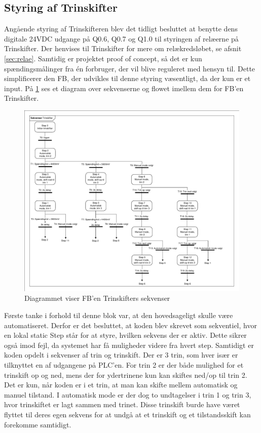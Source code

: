 \subsection{Styring af Trinskifter}

Angående styring af Trinskifteren blev det tidligt besluttet at benytte dens digitale 24VDC udgange på Q0.6, Q0.7 og Q1.0 til styringen af relæerne på Trinskifter. Der henvises til Trinskifter for mere om relækredsløbet, se afsnit \ref{sec:relae}.
Samtidig er projektet proof of concept, så det er kun spændingsmålinger fra én forbruger, der vil blive reguleret med hensyn til. Dette simplificerer den FB, der udvikles til denne styring væsentligt, da der kun er et input. På \ref{fig:GraphTrinskifterPLC} ses et diagram over sekvenserne og flowet imellem dem for FB'en Trinskifter.

\begin{figure}[H] %
	\centering
	\includegraphics[width=1\textwidth]{Figure/GraphTrinskifterPLC}
	\caption{Diagrammet viser FB'en Trinskifters sekvenser}
	\label{fig:GraphTrinskifterPLC}
\end{figure}

Første tanke i forhold til denne blok var, at den hovedsageligt skulle være automatiseret. Derfor er det besluttet, at koden blev skrevet som sekventiel, hvor en lokal static Step står for at styre, hvilken sekvens der er aktiv. Dette sikrer også imod fejl, da systemet har få muligheder videre fra hvert step. Samtidigt er koden opdelt i sekvenser af trin og trinskift. Der er 3 trin, som hver især er tilknyttet en af udgangene på PLC'en. For trin 2 er der både mulighed for et trinskift op og ned, mens der for ydertrinene kun kan skiftes ned/op til trin 2. Det er kun, når koden er i et trin, at man kan skifte mellem automatisk og manuel tilstand. I automatisk mode er der dog to undtagelser i trin 1 og trin 3, hvor trinskiftet er lagt sammen med trinet. Disse trinskift burde have været flyttet til deres egen sekvens for at undgå at et trinskift og et tilstandsskift kan forekomme samtidigt.


